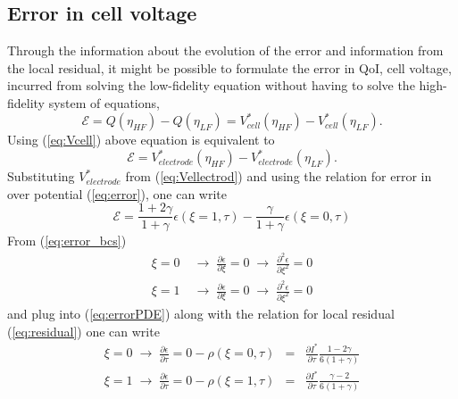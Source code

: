 \documentclass[]{article}
\begin{document}
\subsection{Error in cell voltage}
Through the information about the evolution of the error and information from the local residual, it might be possible to formulate the error in QoI, cell voltage, incurred from solving the low-fidelity equation without having to solve the high-fidelity system of equations,
%
\begin{equation}
\mathcal{E} = Q(\eta_{HF}) - Q(\eta_{LF}) = V^*_{cell}(\eta_{HF}) - V^*_{cell}(\eta_{LF}).
\end{equation}
%
Using (\ref{eq:Vcell}) above equation is equivalent to
%
\begin{equation}\label{eq:error_V_exact}
\mathcal{E} =  V^*_{electrode}(\eta_{HF}) - V^*_{electrode}(\eta_{LF}).
\end{equation}
%
Substituting $V^*_{electrode}$ from (\ref{eq:Vellectrod}) and using the relation for error in over potential (\ref{eq:error}), one can write 
%
\begin{equation}\label{eq:error_V_eta}
\mathcal{E} =  \frac{1+2\gamma}{1+\gamma}\epsilon(\xi=1,\tau) - \frac{\gamma}{1+\gamma}\epsilon(\xi=0,\tau)
\end{equation}
%
From (\ref{eq:error_bcs}) 
%
\begin{eqnarray}
\xi = 0 & \;\rightarrow\; \frac{\partial\epsilon}{\partial\xi}= 0 \;\rightarrow\; \frac{\partial^2\epsilon}{\partial\xi^2}= 0  \\
\xi = 1 & \; \rightarrow\;\frac{\partial\epsilon}{\partial\xi}= 0 \;\rightarrow\; \frac{\partial^2\epsilon}{\partial\xi^2}= 0 \nonumber
\end{eqnarray}
%
and plug into (\ref{eq:errorPDE}) along with the relation for local residual (\ref{eq:residual}) one can write
%
\begin{eqnarray}
\xi = 0 \;\rightarrow\; \frac{\partial\epsilon}{\partial\tau}= 0 -\rho(\xi=0,\tau)& = &\frac{\partial I^*}{\partial\tau} \frac{1-2\gamma}{6(1+\gamma)}\\
\xi = 1 \; \rightarrow\;\frac{\partial\epsilon}{\partial\tau}= 0 -\rho(\xi=1,\tau)& = &\frac{\partial I^*}{\partial\tau} \frac{\gamma-2}{6(1+\gamma)} \nonumber
\end{eqnarray}
%
\end{document}
